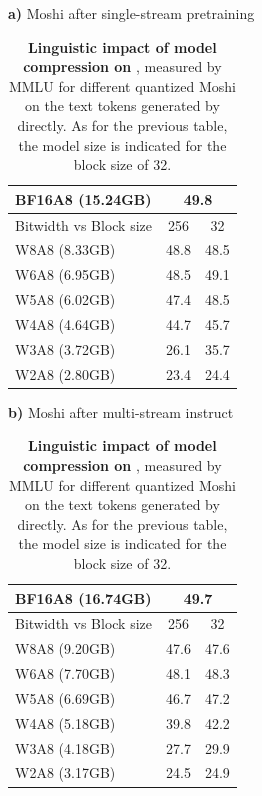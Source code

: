 \begin{table}[t]
    \caption{\label{tab:quantmoshi}\textbf{Linguistic impact of model compression on \ours}, measured by MMLU for different quantized Moshi on the text tokens generated by \interleaving{} directly. As for the previous table, the model size is indicated for the block size of 32.}
    
    \footnotesize
    \centering
    \begin{minipage}[t]{0.47\textwidth}
    \centering
    \textbf{a)} Moshi after single-stream pretraining
    \smallskip 

    \begin{tabular}{lcc}
    \toprule
       BF16A8 (15.24GB)& \multicolumn{2}{c}{49.8} \\
       \midrule
        Bitwidth vs Block size & 256 & 32 \\
        \midrule
         W8A8 (8.33GB) & 48.8 & 48.5\\
         W6A8 (6.95GB)& 48.5 & 49.1 \\
         W5A8 (6.02GB) & 47.4 & 48.5 \\
         W4A8 (4.64GB) & 44.7  & 45.7 \\
         W3A8 (3.72GB) & 26.1 & 35.7 \\
         W2A8 (2.80GB) & 23.4&  24.4\\
        \bottomrule
    \end{tabular}
    \end{minipage}
    \hfill 
        \begin{minipage}[t]{0.47\textwidth}
    \centering
    \textbf{b)} Moshi after multi-stream instruct
    \smallskip
    
    \begin{tabular}{lcc}
        \toprule
       BF16A8 (16.74GB) & \multicolumn{2}{c}{49.7}  \\
        \midrule
        Bitwidth vs Block size & 256 & 32 \\
        \midrule
         W8A8 (9.20GB) & 47.6 & 47.6 \\
         W6A8  (7.70GB)& 48.1 & 48.3 \\
         W5A8 (6.69GB) & 46.7 & 47.2 \\
         W4A8 (5.18GB) & 39.8  & 42.2 \\
         W3A8 (4.18GB) & 27.7 & 29.9 \\
         W2A8 (3.17GB) & 24.5& 24.9 \\
        \bottomrule
    \end{tabular}
    \end{minipage}
\end{table}
